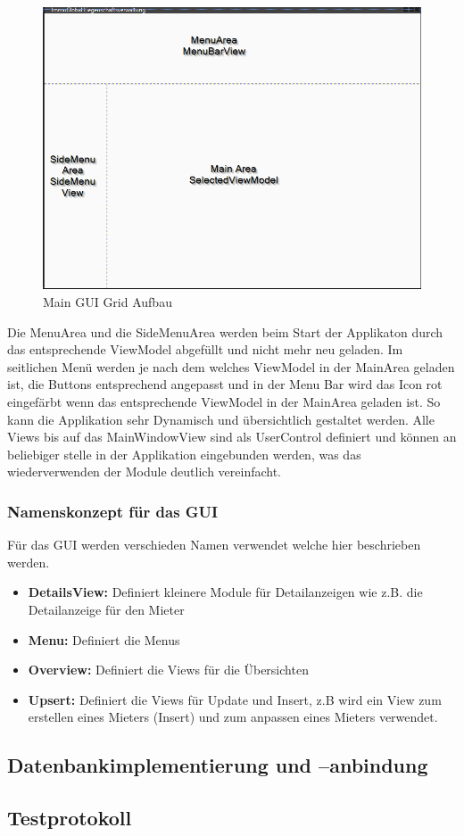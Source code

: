 \begin{figure}[H]
  \begin{center}
    \includegraphics[width=0.6\linewidth]{content/images/MainGuiGrid.png}
    \caption{Main GUI Grid Aufbau}
    \label{guiGrid}
  \end{center}
\end{figure}
Die MenuArea und die SideMenuArea werden beim Start der Applikaton durch das entsprechende ViewModel abgefüllt und nicht mehr neu geladen. Im seitlichen Menü werden je nach dem welches ViewModel in der MainArea geladen ist, die Buttons entsprechend angepasst und in der Menu Bar wird das Icon rot eingefärbt wenn das entsprechende ViewModel in der MainArea geladen ist. So kann die Applikation sehr Dynamisch und übersichtlich gestaltet werden.
Alle Views bis auf das MainWindowView sind als UserControl definiert und können an beliebiger stelle in der Applikation eingebunden werden, was das wiederverwenden der Module deutlich vereinfacht.

\subsubsection{Namenskonzept für das GUI}
Für das GUI werden verschieden Namen verwendet welche hier beschrieben werden.
\begin{itemize}
  \item \textbf{DetailsView:} Definiert kleinere Module für Detailanzeigen wie z.B. die Detailanzeige für den Mieter
  \item \textbf{Menu:} Definiert die Menus
  \item \textbf{Overview:} Definiert die Views für die Übersichten
  \item \textbf{Upsert:} Definiert die Views für Update und Insert, z.B wird ein View zum erstellen eines Mieters (Insert) und zum anpassen eines Mieters verwendet.
\end{itemize}


\subsection{Datenbankimplementierung und –anbindung}
\subsection{Testprotokoll}
